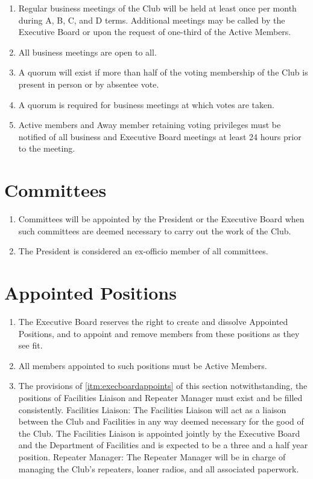 \documentclass[12pt,letterpaper]{book}
\begin{document}
\begin{enumerate}

\item Regular business meetings of the Club will be held at least once per month during A, B, C, and D terms. Additional meetings may be called by the Executive Board or upon the request of one-third of the Active Members.
\item All business meetings are open to all.
\item A quorum will exist if more than half of the voting membership of the Club is present in person or by absentee vote.
\item A quorum is required for business meetings at which votes are taken.
\item Active members and Away member retaining voting privileges must be notified of all business and Executive Board meetings at least 24 hours prior to the meeting.

\end{enumerate}

\chapter{Committees}

\begin{enumerate}

\item Committees will be appointed by the President or the Executive Board when such committees are deemed necessary to carry out the work of the Club.
\item The President is considered an ex-officio member of all committees.

\end{enumerate}

\chapter{Appointed Positions}

\begin{enumerate}

\item  The Executive Board reserves the right to create and dissolve Appointed Positions, and to appoint and remove members from these positions as they see fit.
\item All members appointed to such positions must be Active Members.
\item The provisions of \cref{itm:execboardappoints} of this section notwithstanding, the positions of Facilities Liaison and Repeater Manager must exist and be filled consistently.
\subitem Facilities Liaison: The Facilities Liaison will act as a liaison between the Club and Facilities in any way deemed necessary for the good of the Club. The Facilities Liaison is appointed jointly by the Executive Board and the Department of Facilities and is expected to be a three and a half year position.
\subitem Repeater Manager: The Repeater Manager will be in charge of managing the Club’s repeaters, loaner radios, and all associated paperwork.

\end{enumerate}
\end{document}
